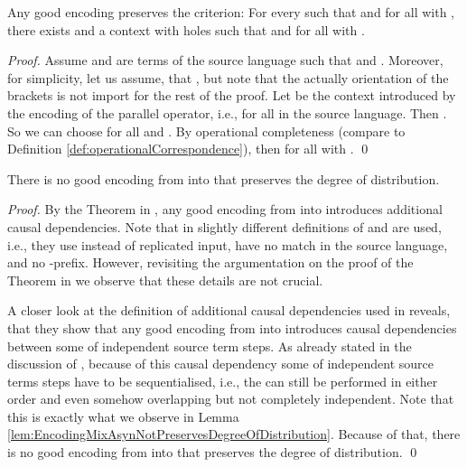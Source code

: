 \documentclass[]{llncs}
\begin{document}
\begin{lemma}
	Any good encoding  preserves the criterion: For every  such that  and  for all  with , there exists  and a context  with  holes such that  and  for all  with .
\end{lemma}

\begin{proof}
	Assume  and  are terms of the source language such that  and . Moreover, for simplicity, let us assume, that , but note that the actually orientation of the brackets is not import for the rest of the proof. Let  be the context introduced by the encoding of the parallel operator, i.e.,  for all  in the source language. Then . So we can choose  for all  and . By operational completeness (compare to Definition \ref{def:operationalCorrespondence}), then  for all  with .
	\qed
\end{proof}

\begin{theorem}
	There is no good encoding from \piMix into \piAsyn that preserves the degree of distribution.
\end{theorem}

\begin{proof}
	By the Theorem in \cite{petersSchickeNestmann11}, any good encoding from \piMix into \piAsyn introduces additional causal dependencies. Note that in \cite{petersSchickeNestmann11} slightly different definitions of \piMix and \piAsyn are used, i.e., they use  instead of replicated input, have no match in the source language, and no -prefix. However, revisiting the argumentation on the proof of the Theorem in \cite{petersSchickeNestmann11} we observe that these details are not crucial.
	
	A closer look at the definition of additional causal dependencies used in \cite{petersSchickeNestmann11} reveals, that they show that any good encoding from \piMix into \piAsyn introduces causal dependencies between some \simulations of independent source term steps. As already stated in the discussion of \cite{petersSchickeNestmann11}, because of this causal dependency some \simulations of independent source terms steps have to be sequentialised, i.e., the \simulations can still be performed in either order and even somehow overlapping but not completely independent. Note that this is exactly what we observe in Lemma \ref{lem:EncodingMixAsynNotPreservesDegreeOfDistribution}. Because of that, there is no good encoding from \piMix into \piAsyn that preserves the degree of distribution.
	\qed
\end{proof}
\end{document}
